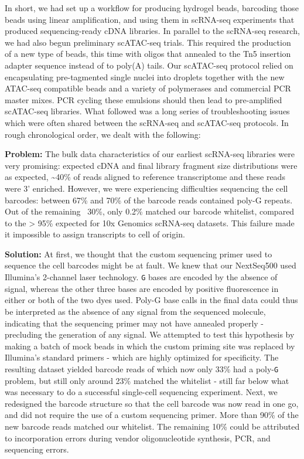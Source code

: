 In short, we had set up a workflow for producing hydrogel beads, barcoding those beads using linear amplification, and using them in scRNA-seq experiments that produced sequencing-ready cDNA libraries. In parallel to the scRNA-seq research, we had also begun preliminary scATAC-seq trials. This required the production of a new type of beads, this time with oligos that annealed to the Tn5 insertion adapter sequence instead of to poly(A) tails. Our scATAC-seq protocol relied on encapsulating pre-tagmented single nuclei into droplets together with the new ATAC-seq compatible beads and a variety of polymerases and commercial PCR master mixes. PCR cycling these emulsions should then lead to pre-amplified scATAC-seq libraries. What followed was a long series of troubleshooting issues which were often shared between the scRNA-seq and scATAC-seq protocols. In rough chronological order, we dealt with the following:

\textbf{Problem:} The bulk data characteristics of our earliest scRNA-seq libraries were very promising: expected cDNA and final library fragment size distributions were as expected, \textasciitilde{40}\% of reads aligned to reference transcriptome and these reads were 3' enriched. However, we were experiencing difficulties sequencing the cell barcodes: between 67\% and 70\% of the barcode reads contained poly-G repeats. Out of the remaining ~30\%, only 0.2\% matched our barcode whitelist, compared to the > 95\% expected for 10x Genomics scRNA-seq datasets. This failure made it impossible to assign transcripts to cell of origin.

\textbf{Solution:} At first, we thought that the custom sequencing primer used to sequence the cell barcodes might be at fault. We knew that our NextSeq500 used Illumina's 2-channel laser technology. \verb|G| bases are encoded by the absence of signal, whereas the other three bases are encoded by positive fluorescence in either or both of the two dyes used. Poly-G base calls in the final data could thus be interpreted as the absence of any signal from the sequenced molecule, indicating that the sequencing primer may not have annealed properly - precluding the generation of any signal. We attempted to test this hypothesis by making a batch of mock beads in which the custom priming site was replaced by Illumina's standard primers - which are highly optimized for specificity. The resulting dataset yielded barcode reads of which now only 33\% had a poly-\verb|G| problem, but still only around 23\% matched the whitelist - still far below what was necessary to do a successful single-cell sequencing experiment. Next, we redesigned the barcode structure so that the cell barcode was now read in one go, and did not require the use of a custom sequencing primer. More than 90\% of the new barcode reads matched our whitelist. The remaining 10\% could be attributed to incorporation errors during vendor oligonucleotide synthesis, PCR, and sequencing errors.

